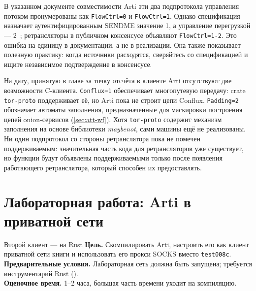 \begin{attenzione}
В указанном документе совместимости Arti эти два подпротокола управления потоком пронумерованы как \texttt{FlowCtrl=0} и \texttt{FlowCtrl=1}. Однако спецификация назначает аутентифицированным SENDME значение 1, а управление перегрузкой — 2~; ретрансляторы в публичном консенсусе объявляют \texttt{FlowCtrl=1-2}. Это ошибка на единицу в документации, а не в реализации. Она также показывает полезную практику: когда источники расходятся, сверяйтесь со спецификацией и ищите независимое подтверждение в консенсусе.
\end{attenzione}

На дату, принятую в главе за точку отсчёта в клиенте Arti отсутствуют две возможности C-клиента. \texttt{Conflux=1} обеспечивает многопутевую передачу: crate \texttt{tor-proto} поддерживает её, но Arti пока не строит цепи Conflux. \texttt{Padding=2} обозначает автоматы заполнения, предназначенные для маскировки построения цепей onion-сервисов (\cref{sec:att-wf}). Хотя \texttt{tor-proto} содержит механизм заполнения на основе библиотеки \emph{maybenot}, сами машины ещё не реализованы. Ни один подпротокол со стороны ретранслятора пока не помечен поддерживаемым: значительная часть кода для ретрансляторов уже существует, но функции будут объявлены поддерживаемыми только после появления работающего ретранслятора, который способен их предоставлять.

\section{Лабораторная работа: Arti в приватной сети}\label{sec:lab-arti}

\begin{laboratorio}[20]{Второй клиент — на Rust}
\textbf{Цель.} Скомпилировать Arti, настроить его как клиент приватной сети книги и использовать его прокси SOCKS вместо \texttt{test008c}.\\
\textbf{Предварительные условия.} Лабораторная сеть должна быть запущена; требуется инструментарий Rust ().\\
\textbf{Оценочное время.} 1--2 часа, большая часть времени уходит на компиляцию.
\end{laboratorio}

